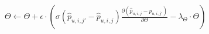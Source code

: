 \documentclass[preview,convert={outext=.png,density=1600}]{standalone}
\begin{document}
$\Theta \leftarrow \Theta + \epsilon \cdot \left( \sigma(\hat{p}_{u, i, j'} - \hat{p}_{u, i, j}) \frac{\partial(\hat{p}_{u, i, j} - \hat{p}_{u, i, j'})}{\partial \Theta} - \lambda_\Theta \cdot \Theta \right)$
\end{document}
